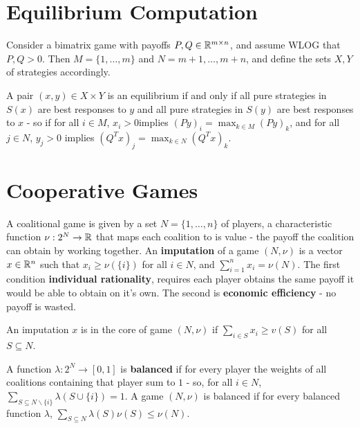 \section{Equilibrium Computation}
\label{sec:equil-comp}

\begin{defn}
  \label{sec:equil-comp-1}
  Consider a bimatrix game with payoffs $P, Q \in \mathbb{R}^{m \times n}$,
  and assume WLOG that $P, Q > 0$. Then $M = \{ 1, \dots, m \}$ and $N
  = m+1, \dots, m+n$, and define the sets $X, Y$ of strategies
  accordingly.
  
  A pair $(x, y) \in X \times Y$ is an equilibrium if and only if all
  pure strategies in $S(x)$ are best responses to $y$ and all pure
  strategies in $S(y)$ are best responses to $x$ - so if for all $i
  \in M$, $x_{i} > 0$implies $(Py)_{i} = \max_{k \in M}(Py)_{k}$, and
  for all $j \in N$, $y_{j} > 0$ implies $(Q^{T} x)_{j} = \max_{k \in
    N} (Q^{T}x)_{k}$.
\end{defn}


\section{Cooperative Games}
\label{sec:cooperative-games}

\begin{defn}
  \label{sec:cooperative-games-1}
  A coalitional game is given by a set $N = \{ 1, \dots, n \} $ of
  players, a characteristic function $\nu: 2^{N} \rightarrow \mathbb{R}$ that
  maps each coalition to is value - the payoff the coalition can obtain
  by working together.  An \textbf{imputation} of a game $(N, \nu)$ is a
  vector $x \in \mathbb{R}^{n}$ such that $x_{i} \geq \nu(\{ i \} )$ for all $i
  \in N$, and $\sum_{i=1}^{n} x_{i} = \nu(N)$.  The first condition
  \textbf{individual rationality}, requires each player obtains the
  same payoff it would be able to obtain on it's own.  The second is
  \textbf{economic efficiency} - no payoff is wasted.
\end{defn} 


\begin{defn}
  \label{sec:cooperative-games-4}
  An imputation $x$ is in the core of game $(N, \nu)$ if $\sum_{i \in
    S}^{} x_{i} \geq v(S)$ for all $S \subseteq N$.
\end{defn}

\begin{defn}
  \label{sec:cooperative-games-2}
  A function $\lambda: 2^{N} \rightarrow [0, 1]$ is \textbf{balanced}
  if for every player the weights of all coalitions containing that
  player sum to $1$ - so, for all $i \in N$, $\sum_{S \subseteq N
    \backslash \{ i \} }^{} \lambda(S \cup \{ i \}) = 1$.  A game $(N,
  \nu)$ is balanced if for every balanced function $\lambda$, $\sum_{S
    \subseteq N}^{} \lambda(S) \nu(S) \leq \nu(N)$.
\end{defn}

